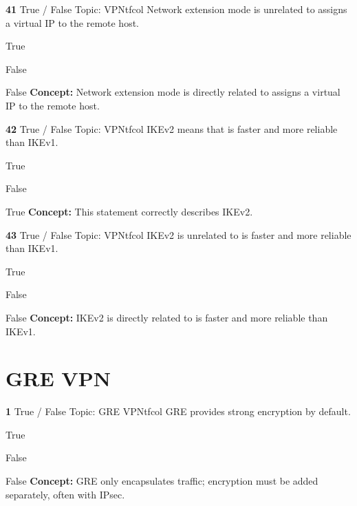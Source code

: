 \documentclass[10pt,a4paper]{article}
\begin{document}
\begin{qcard}{\color{white}\textbf{41} \hfill \small True / False \textbar{} Topic: VPN}{tfcol}
Network extension mode is unrelated to assigns a virtual IP to the remote host.

\begin{qoptions}
\item True
\item False
\end{qoptions}
\begin{explainbox}{False}
\textbf{Concept:} Network extension mode is directly related to assigns a virtual IP to the remote host.
\end{explainbox}
\end{qcard}

\begin{qcard}{\color{white}\textbf{42} \hfill \small True / False \textbar{} Topic: VPN}{tfcol}
IKEv2 means that is faster and more reliable than IKEv1.

\begin{qoptions}
\item True
\item False
\end{qoptions}
\begin{explainbox}{True}
\textbf{Concept:} This statement correctly describes IKEv2.
\end{explainbox}
\end{qcard}

\begin{qcard}{\color{white}\textbf{43} \hfill \small True / False \textbar{} Topic: VPN}{tfcol}
IKEv2 is unrelated to is faster and more reliable than IKEv1.

\begin{qoptions}
\item True
\item False
\end{qoptions}
\begin{explainbox}{False}
\textbf{Concept:} IKEv2 is directly related to is faster and more reliable than IKEv1.
\end{explainbox}
\end{qcard}

\section{GRE VPN}
\begin{qcard}{\color{white}\textbf{1} \hfill \small True / False \textbar{} Topic: GRE VPN}{tfcol}
GRE provides strong encryption by default.

\begin{qoptions}
\item True
\item False
\end{qoptions}
\begin{explainbox}{False}
\textbf{Concept:} GRE only encapsulates traffic; encryption must be added separately, often with IPsec.
\end{explainbox}
\end{qcard}
\end{document}
